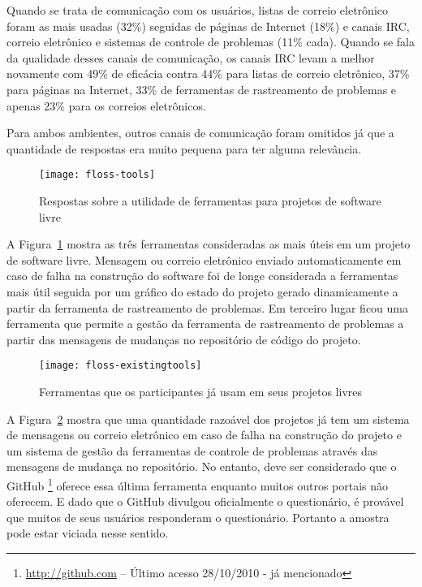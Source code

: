 Quando se trata de comunicação com os usuários, listas de correio
eletrônico foram as mais usadas (32\%) seguidas de páginas de Internet
(18\%) e canais IRC, correio eletrônico e sistemas de controle de
problemas (11\% cada). Quando se fala da qualidade desses canais de
comunicação, os canais IRC levam a melhor novamente com 49\% de
eficácia contra 44\% para listas de correio eletrônico, 37\% para
páginas na Internet, 33\% de ferramentas de rastreamento de problemas
e apenas 23\% para os correios eletrônicos.

Para ambos ambientes, outros canais de comunicação foram omitidos já
que a quantidade de respostas era muito pequena para ter alguma
relevância.

\begin{figure}
  \centering
  \texttt{[image: floss-tools]}
  \caption{Respostas sobre a utilidade de ferramentas para projetos de
    software livre}
  \label{fig:floss-tools}
\end{figure}

A Figura~\ref{fig:floss-tools} mostra as três ferramentas consideradas
as mais úteis em um projeto de software livre. Mensagem ou correio
eletrônico enviado automaticamente em caso de falha na construção do
software foi de longe considerada a ferramentas mais útil seguida por
um gráfico do estado do projeto gerado dinamicamente a partir da
ferramenta de rastreamento de problemas. Em terceiro lugar ficou uma
ferramenta que permite a gestão da ferramenta de rastreamento de
problemas a partir das mensagens de mudanças no repositório de código
do projeto.

\begin{figure}
  \centering
  \texttt{[image: floss-existingtools]}
  \caption{Ferramentas que os participantes já usam em seus projetos
    livres}
  \label{fig:floss-existingtools}
\end{figure}

A Figura~\ref{fig:floss-existingtools} mostra que uma quantidade
razoável dos projetos já tem um sistema de mensagens ou correio
eletrônico em caso de falha na construção do projeto e um sistema de
gestão da ferramentas de controle de problemas através das mensagens
de mudança no repositório. No entanto, deve ser considerado que o
GitHub \footnote{\url{http://github.com} -- Último acesso 28/10/2010 -
  já mencionado} oferece essa última ferramenta enquanto muitos outros
portais não oferecem. E dado que o GitHub divulgou oficialmente o
questionário, é provável que muitos de seus usuários responderam o
questionário. Portanto a amostra pode estar viciada nesse sentido.

